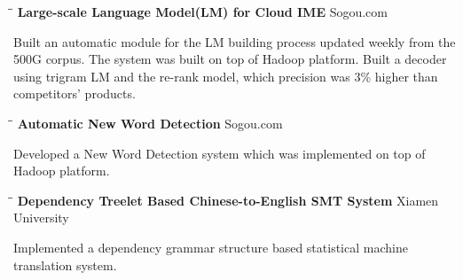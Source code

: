 \documentclass{res}
\begin{document}
\begin{resume}
   \begin{tabbing}
   \hspace{2in}\= \hspace{3in}\= \kill %
    {\bf Large-scale Language Model(LM) for Cloud IME} \> \>Sogou.com     \\
   \end{tabbing}\vspace{-30pt}      %
   Built an automatic module for the LM building process updated weekly from the 500G corpus. The system was built on top of Hadoop platform. Built a decoder using trigram LM and the re-rank model, which precision was 3\% higher than competitors' products.
   \vspace{-0.1in}
   \begin{tabbing}
   \hspace{2in}\= \hspace{3in}\= \kill %
    {\bf Automatic New Word Detection}\> \>Sogou.com     \\
   \end{tabbing}\vspace{-30pt}      %
   Developed a New Word Detection system which was implemented on top of Hadoop platform.\\
   \vspace{-0.1in}
   \begin{tabbing}
   \hspace{2in}\= \hspace{3in}\= \kill %
    {\bf Dependency Treelet Based Chinese-to-English SMT System} \> \>Xiamen University\\
   \end{tabbing}\vspace{-30pt}      %
   Implemented a dependency grammar structure based statistical machine translation system. \\
   \vspace{-0.1in}

\end{resume}
\end{document}

